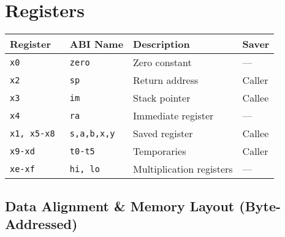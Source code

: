 \section*{Registers}
\begin{center}
\begin{tabular} {l | l | l | l} \hline
Register       & ABI Name       & Description              & Saver  \\ \hline
\tt{x0}        & \tt{zero}      & Zero constant            & ---    \\
\tt{x2}        & \tt{sp}        & Return address           & Caller \\
\tt{x3}        & \tt{im}        & Stack pointer            & Callee \\
\tt{x4}        & \tt{ra}        & Immediate register       & ---    \\
\tt{x1, x5-x8} & \tt{s,a,b,x,y} & Saved register           & Callee \\
\tt{x9-xd}     & \tt{t0-t5}     & Temporaries              & Caller \\
\tt{xe-xf}     & \tt{hi, lo}    & Multiplication registers & --- \\
\hline

\end{tabular}
\end{center}

\subsection*{Data Alignment \& Memory Layout (Byte-Addressed)}


